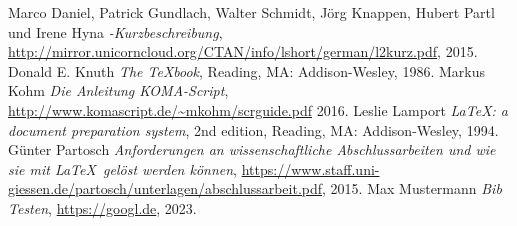 %

\begin{thebibliography}{99}

	Marco Daniel, Patrick Gundlach, Walter Schmidt, Jörg Knappen, Hubert
	Partl und Irene Hyna
	\emph{\LaTeXe-Kurzbeschreibung},
	\url{http://mirror.unicorncloud.org/CTAN/info/lshort/german/l2kurz.pdf},
	2015.
	Donald E. Knuth
	\emph{The \TeX book},
  Reading, MA: Addison-Wesley,
	1986.
	Markus Kohm
	\emph{Die Anleitung \textsf{KOMA-Script}},
	\url{http://www.komascript.de/~mkohm/scrguide.pdf}
	2016.
  Leslie Lamport
  \emph{\LaTeX: a document preparation system},
  2nd edition,
  Reading, MA: Addison-Wesley,
  1994.
	Günter Partosch
	\emph{Anforderungen an wissenschaftliche Abschlussarbeiten und wie sie
	mit \LaTeX\ gelöst werden können},
	\url{https://www.staff.uni-giessen.de/partosch/unterlagen/abschlussarbeit.pdf},
	2015.
    Max Mustermann
    \emph{Bib Testen},
    \url{https://googl.de},
    2023.

\end{thebibliography}

